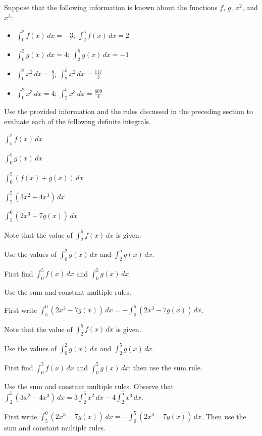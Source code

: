 \begin{activity} \label{A:4.3.2}  Suppose that the following information is known about the functions $f$, $g$, $x^2$, and $x^3$:
\begin{itemize}
	\item $\int_0^2 f(x) \, dx = -3$; $\int_2^5 f(x) \, dx = 2$
	\item $\int_0^2 g(x) \, dx = 4$; $\int_2^5 g(x) \, dx = -1$
	\item $\int_0^2 x^2 \, dx = \frac{8}{3}$; $\int_2^5 x^2 \, dx = \frac{117}{3}$
	\item $\int_0^2 x^3 \, dx = 4$; $\int_2^5 x^3 \, dx = \frac{609}{4} $
\end{itemize}
Use the provided information and the rules discussed in the preceding section to evaluate each of the following definite integrals.
\ba
	\item $\int_5^2 f(x) \, dx$
	\item $\int_0^5 g(x) \, dx$
	\item $\int_0^5 (f(x) + g(x))\, dx$
	\item $\int_2^5 (3x^2 - 4x^3) \, dx$
	\item $\int_5^0 (2x^3 - 7g(x)) \, dx$
\ea
\end{activity}
\begin{smallhint}
\ba
	\item Note that the value of $\int_2^5 f(x) \, dx$ is given.
	\item Use the values of $\int_0^2 g(x) \,dx$ and $\int_2^5 g(x) \,dx$.
	\item First find $\int_0^5 f(x) \, dx$ and $\int_0^5 g(x) \, dx$.
	\item Use the sum and constant multiple rules.
	\item First write $\int_5^0 (2x^3 - 7g(x)) \, dx = -\int_0^5 (2x^3 - 7g(x)) \, dx$.
\ea
\end{smallhint}
\begin{bighint}
\ba
	\item Note that the value of $\int_2^5 f(x) \, dx$ is given.
	\item Use the values of $\int_0^2 g(x) \,dx$ and $\int_2^5 g(x) \,dx$.
	\item First find $\int_0^5 f(x) \, dx$ and $\int_0^5 g(x) \, dx$; then use the sum rule.
	\item Use the sum and constant multiple rules.  Observe that $\int_2^5 (3x^2 - 4x^3) \, dx = 3\int_2^5 x^2 \, dx - 4\int_2^5 x^3 \, dx.$
	\item First write $\int_5^0 (2x^3 - 7g(x)) \, dx = -\int_0^5 (2x^3 - 7g(x)) \, dx$.  Then use the sum and constant multiple rules.
\ea
\end{bighint}
